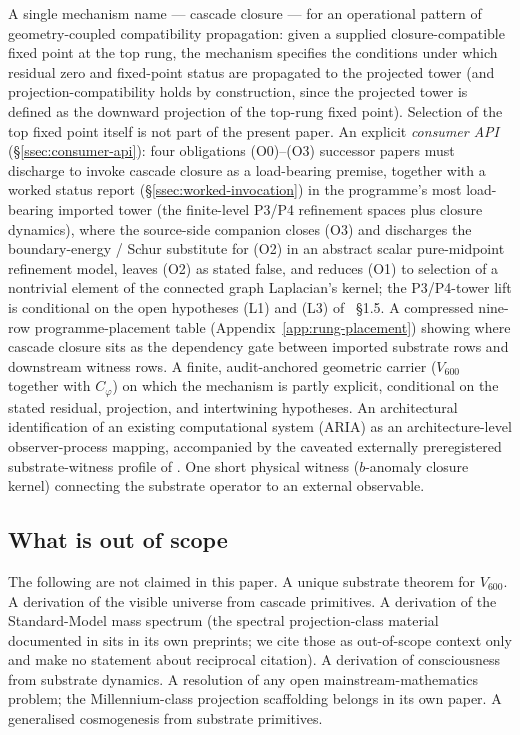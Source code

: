\documentclass[11pt]{article}
\theoremstyle{definition}
\newcommand{\pphi}{\varphi}
\newcommand{\Vsub}{V_{600}}
\newcommand{\Cphi}{C_{\pphi}}
\begin{document}
A single mechanism name --- cascade closure --- for an operational
pattern of geometry-coupled compatibility propagation: given a
supplied closure-compatible fixed point at the top rung, the
mechanism specifies the conditions under which residual zero and
fixed-point status are propagated to the projected tower (and projection-compatibility holds by construction, since the projected tower is defined as the downward projection of the top-rung fixed point).
Selection of the top fixed point itself is not part of the present
paper. An explicit \emph{consumer API}
(\S\ref{ssec:consumer-api}): four obligations (O0)--(O3) successor
papers must discharge to invoke cascade closure as a load-bearing
premise, together with a worked status report
(\S\ref{ssec:worked-invocation}) in the programme's most
load-bearing imported tower (the finite-level P3/P4 refinement
spaces plus closure dynamics), where the source-side companion
\cite{CascadeRefinementCompat} closes (O3) and discharges the
boundary-energy / Schur substitute for (O2) in an abstract scalar
pure-midpoint refinement model, leaves (O2) as stated false, and
reduces (O1) to selection of a nontrivial element of the connected
graph Laplacian's kernel; the P3/P4-tower lift is conditional on
the open hypotheses (L1) and (L3) of
\cite{CascadeRefinementCompat}~\S1.5. A compressed nine-row programme-placement table
(Appendix~\ref{app:rung-placement}) showing where cascade closure
sits as the dependency gate between imported substrate rows and
downstream witness rows. A finite, audit-anchored geometric carrier
($\Vsub$ together with $\Cphi$) on which the mechanism is partly
explicit, conditional on the stated residual, projection, and
intertwining hypotheses. An
architectural identification of an existing computational system
(ARIA) as an architecture-level observer-process mapping, accompanied by the
caveated externally preregistered substrate-witness profile of
\cite{SmartARIAChess}. One short physical
witness ($b$-anomaly closure kernel) connecting the substrate operator
to an external observable.

\subsection{What is out of scope}

The following are not claimed in this paper. A unique substrate
theorem for $\Vsub$. A derivation of the visible universe from cascade
primitives. A derivation of the Standard-Model mass spectrum (the
spectral projection-class material documented in
\cite{SmartV, SmartVRev} sits in its own preprints; we cite those as
out-of-scope context only and make no statement about reciprocal
citation). A derivation of consciousness from substrate dynamics. A
resolution of any open mainstream-mathematics problem; the
Millennium-class projection scaffolding belongs in its own paper. A
generalised cosmogenesis from substrate primitives.
\end{document}
